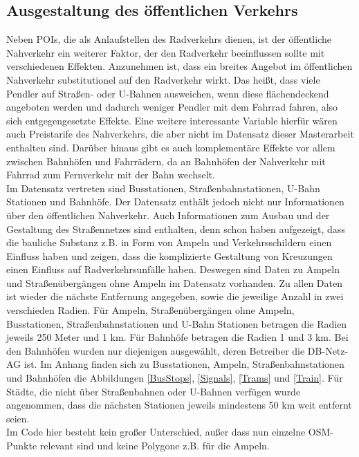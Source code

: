 \documentclass[a4paper,12pt]{thesis}
\begin{document}
\subsection{Ausgestaltung des öffentlichen Verkehrs}

Neben POIs, die als Anlaufstellen des Radverkehrs dienen, ist der öffentliche Nahverkehr ein weiterer Faktor, der den Radverkehr beeinflussen sollte mit verschiedenen Effekten. Anzunehmen ist, dass ein breites Angebot im öffentlichen Nahverkehr substitutionel auf den Radverkehr wirkt. Das heißt, dass viele Pendler auf Straßen- oder U-Bahnen ausweichen, wenn diese flächendeckend angeboten werden und dadurch weniger Pendler mit dem Fahrrad fahren, also sich entgegengesetzte Effekte. Eine weitere interessante Variable hierfür wären auch Preistarife des Nahverkehrs, die aber nicht im Datensatz dieser Masterarbeit enthalten sind. Darüber hinaus gibt es auch komplementäre Effekte vor allem zwischen Bahnhöfen und Fahrrädern, da an Bahnhöfen der Nahverkehr mit Fahrrad zum Fernverkehr mit der Bahn wechselt.\\
Im Datensatz vertreten sind Busstationen, Straßenbahnstationen, U-Bahn Stationen und Bahnhöfe. Der Datensatz enthält jedoch nicht nur Informationen über den öffentlichen Nahverkehr. Auch Informationen zum Ausbau und der Gestaltung des Straßennetzes sind enthalten, denn schon \cite{Heinen2010} haben aufgezeigt, dass die bauliche Substanz z.B. in Form von Ampeln und Verkehrsschildern einen Einfluss haben und \cite{Vandenbulcke2014} zeigen, dass die komplizierte Gestaltung von Kreuzungen einen Einfluss auf Radverkehrsunfälle haben. Deswegen sind Daten zu Ampeln und Straßenübergängen ohne Ampeln im Datensatz vorhanden. Zu allen Daten ist wieder die nächste Entfernung angegeben, sowie die jeweilige Anzahl in zwei verschieden Radien. Für Ampeln, Straßenübergängen ohne Ampeln, Busstationen, Straßenbahnstationen und U-Bahn Stationen betragen die Radien jeweils 250 Meter und 1 km. Für Bahnhöfe betragen die Radien 1 und 3 km. Bei den Bahnhöfen wurden nur diejenigen ausgewählt, deren Betreiber die DB-Netz-AG ist. Im Anhang finden sich zu Busstationen, Ampeln, Straßenbahnstationen und Bahnhöfen die Abbildungen \ref{BusStops}, \ref{Signals}, \ref{Trams} und \ref{Train}. Für Städte, die nicht über Straßenbahnen oder U-Bahnen verfügen wurde angenommen, dass die nächsten Stationen jeweils mindestens 50 km weit entfernt seien.\\
Im Code hier besteht kein großer Unterschied, außer dass nun einzelne OSM-Punkte relevant sind und keine Polygone z.B. für die Ampeln.
\end{document}
